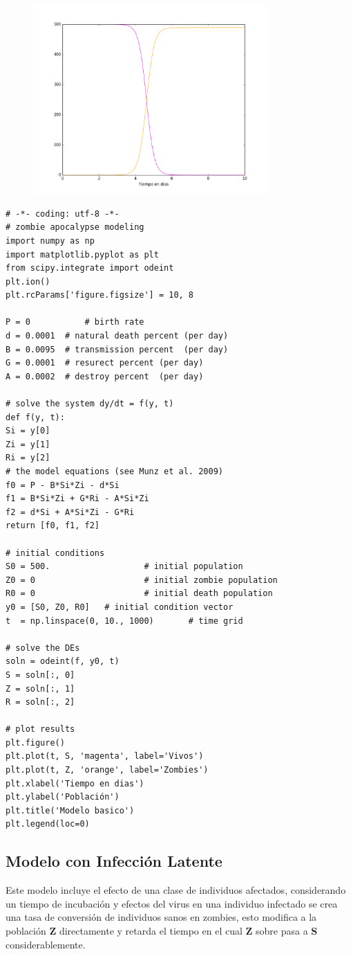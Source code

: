 \documentclass[12pt]{article}
\begin{document}
\begin{figure}[H]
	\includegraphics[width=9cm]{basico.png}
\end{figure}

\begin{verbatim}
# -*- coding: utf-8 -*-
# zombie apocalypse modeling
import numpy as np
import matplotlib.pyplot as plt
from scipy.integrate import odeint
plt.ion()
plt.rcParams['figure.figsize'] = 10, 8

P = 0           # birth rate
d = 0.0001  # natural death percent (per day)
B = 0.0095  # transmission percent  (per day)
G = 0.0001  # resurect percent (per day)
A = 0.0002  # destroy percent  (per day)

# solve the system dy/dt = f(y, t)
def f(y, t):
Si = y[0]
Zi = y[1]
Ri = y[2]
# the model equations (see Munz et al. 2009)
f0 = P - B*Si*Zi - d*Si
f1 = B*Si*Zi + G*Ri - A*Si*Zi
f2 = d*Si + A*Si*Zi - G*Ri
return [f0, f1, f2]

# initial conditions
S0 = 500.                   # initial population
Z0 = 0                      # initial zombie population
R0 = 0                      # initial death population
y0 = [S0, Z0, R0]   # initial condition vector
t  = np.linspace(0, 10., 1000)       # time grid

# solve the DEs
soln = odeint(f, y0, t)
S = soln[:, 0]
Z = soln[:, 1]
R = soln[:, 2]

# plot results
plt.figure()
plt.plot(t, S, 'magenta', label='Vivos')
plt.plot(t, Z, 'orange', label='Zombies')
plt.xlabel('Tiempo en dias')
plt.ylabel('Población')
plt.title('Modelo basico')
plt.legend(loc=0)

\end{verbatim}




\subsection{Modelo con Infección Latente}
Este modelo incluye el efecto de una clase de individuos afectados, considerando un tiempo de incubación y efectos del virus en una individuo infectado se crea una tasa de conversión de individuos sanos en zombies, esto modifica a la población \textbf{Z} directamente y retarda el tiempo en el cual \textbf{Z} sobre pasa a \textbf{S} considerablemente.
\end{document}
